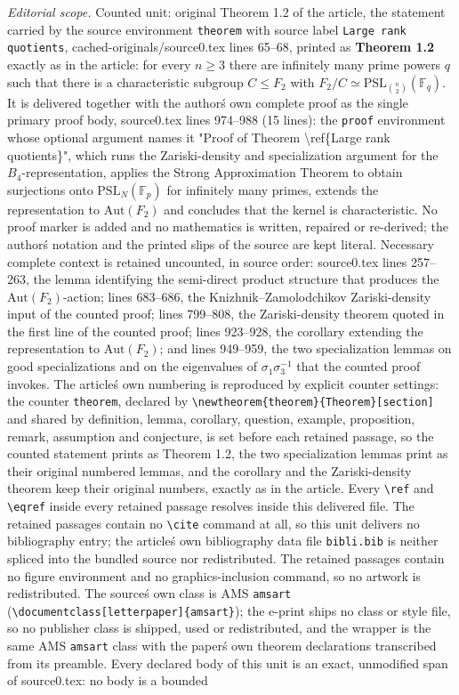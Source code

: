 \documentclass[10pt,a4paper]{amsart}
\begin{document}
\noindent\textit{Editorial scope.} Counted unit: original Theorem 1.2 of the article, the statement carried by the source environment \texttt{theorem} with source label \texttt{Large rank quotients}, cached-originals/source0.tex lines 65--68, printed as \textbf{Theorem 1.2} exactly as in the article: for every $n \geq 3$ there are infinitely many prime powers $q$ such that there is a characteristic subgroup $C \leq F_2$ with $F_2 / C \simeq \mathrm{PSL}_{\binom{n}{2}}(\mathbb{F}_q)$. It is delivered together with the author\'s own complete proof as the single primary proof body, source0.tex lines 974--988 (15 lines): the \texttt{proof} environment whose optional argument names it "Proof of Theorem \textbackslash ref\{Large rank quotients\}", which runs the Zariski-density and specialization argument for the $B_4$-representation, applies the Strong Approximation Theorem to obtain surjections onto $\mathrm{PSL}_N(\mathbb{F}_p)$ for infinitely many primes, extends the representation to $\mathrm{Aut}(F_2)$ and concludes that the kernel is characteristic. No proof marker is added and no mathematics is written, repaired or re-derived; the author\'s notation and the printed slips of the source are kept literal. Necessary complete context is retained uncounted, in source order: source0.tex lines 257--263, the lemma identifying the semi-direct product structure that produces the $\mathrm{Aut}(F_2)$-action; lines 683--686, the Knizhnik--Zamolodchikov Zariski-density input of the counted proof; lines 799--808, the Zariski-density theorem quoted in the first line of the counted proof; lines 923--928, the corollary extending the representation to $\mathrm{Aut}(F_2)$; and lines 949--959, the two specialization lemmas on good specializations and on the eigenvalues of $\sigma_1\sigma_3^{-1}$ that the counted proof invokes. The article\'s own numbering is reproduced by explicit counter settings: the counter \texttt{theorem}, declared by \texttt{\textbackslash newtheorem\{theorem\}\{Theorem\}[section]} and shared by definition, lemma, corollary, question, example, proposition, remark, assumption and conjecture, is set before each retained passage, so the counted statement prints as Theorem 1.2, the two specialization lemmas print as their original numbered lemmas, and the corollary and the Zariski-density theorem keep their original numbers, exactly as in the article. Every \texttt{\textbackslash ref} and \texttt{\textbackslash eqref} inside every retained passage resolves inside this delivered file. The retained passages contain no \texttt{\textbackslash cite} command at all, so this unit delivers no bibliography entry; the article\'s own bibliography data file \texttt{bibli.bib} is neither spliced into the bundled source nor redistributed. The retained passages contain no figure environment and no graphics-inclusion command, so no artwork is redistributed. The source\'s own class is AMS \texttt{amsart} (\texttt{\textbackslash documentclass[letterpaper]\{amsart\}}); the e-print ships no class or style file, so no publisher class is shipped, used or redistributed, and the wrapper is the same AMS \texttt{amsart} class with the paper\'s own theorem declarations transcribed from its preamble. Every declared body of this unit is an exact, unmodified span of source0.tex: no body is a bounded 
\end{document}
